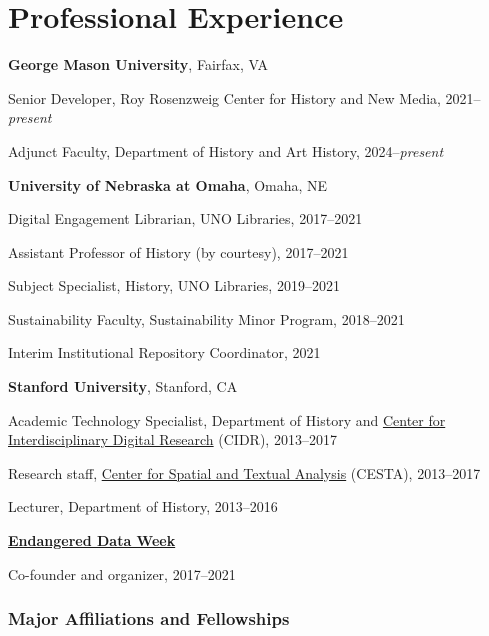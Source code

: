 \section{Professional Experience}\label{professional-experience}

\textbf{George Mason University}, Fairfax, VA

\quad Senior Developer, Roy Rosenzweig Center for History and New Media,
2021--\emph{present}

\quad Adjunct Faculty, Department of History and Art History,
2024--\emph{present}

\vspace{.4cm}

\textbf{University of Nebraska at Omaha}, Omaha, NE

\quad Digital Engagement Librarian, UNO Libraries, 2017--2021

\quad Assistant Professor of History (by courtesy), 2017--2021

\quad Subject Specialist, History, UNO Libraries, 2019--2021

\quad Sustainability Faculty, Sustainability Minor Program, 2018--2021

\quad Interim Institutional Repository Coordinator, 2021

\vspace{.4cm}

\textbf{Stanford University}, Stanford, CA

\quad Academic Technology Specialist, Department of History and
\href{http://cidr.stanford.edu}{Center for Interdisciplinary Digital
Research} (CIDR), 2013--2017

\quad Research staff, \href{http://cesta.stanford.edu}{Center for
Spatial and Textual Analysis} (CESTA), 2013--2017

\quad Lecturer, Department of History, 2013--2016

\vspace{.4cm}

\textbf{\href{https://endangereddataweek.org}{Endangered Data Week}}

\quad Co-founder and organizer, 2017--2021

\vspace{0.2cm}

\subsubsection{Major Affiliations and
Fellowships}\label{major-affiliations-and-fellowships}

